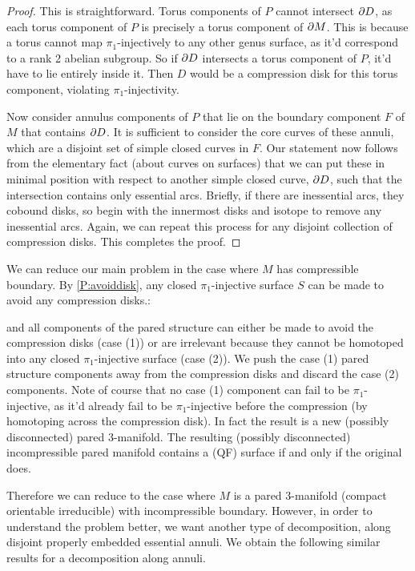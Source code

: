 \begin{proof}

This is straightforward. Torus components of $P$ cannot intersect $\partial D$, as
each torus component of $P$ is precisely a torus component of $\partial M$. This is
because a torus cannot map $\pi_1$-injectively to any other genus surface, as
it'd correspond to a rank 2 abelian subgroup. So if $\partial D$ intersects a torus
component of $P$, it'd have to lie entirely inside it. Then $D$ would be
a compression disk for this torus component, violating $\pi_1$-injectivity.

Now consider annulus components of $P$ that lie on the boundary component $F$
of $M$ that contains $\partial D$. It is sufficient to consider the core curves of
these annuli, which are a disjoint set of simple closed curves in $F$. Our
statement now follows from the elementary fact (about curves on surfaces) that
we can put these in minimal position with respect to another simple closed
curve, $\partial D$, such that the intersection contains only essential arcs.
Briefly, if there are inessential arcs, they cobound disks, so begin with the
innermost disks and isotope to remove any inessential arcs. Again, we can
repeat this process for any disjoint collection of compression disks. This
completes the proof.

\end{proof}

We can reduce our main problem in the case where $M$ has compressible boundary.
By \ref{P:avoiddisk}, any closed $\pi_1$-injective surface $S$ can be made to
avoid any compression disks.:

and all components of the pared structure can either be made to avoid the
compression disks (case (1)) or are irrelevant because they cannot be homotoped
into any closed $\pi_1$-injective surface (case (2)). We push the case (1)
pared structure components away from the compression disks and discard the case
(2) components. Note of course that no case (1) component can fail to be
$\pi_1$-injective, as it'd already fail to be $\pi_1$-injective before the
compression (by homotoping across the compression disk). In fact the result is
a new (possibly disconnected) pared $3$-manifold.  The resulting (possibly
disconnected) incompressible pared manifold contains a (QF) surface if and only
if the original does.

Therefore we can reduce to the case where $M$ is a pared $3$-manifold (compact
orientable irreducible) with incompressible boundary. However, in order to
understand the problem better, we want another type of decomposition, along
disjoint properly embedded essential annuli. We obtain the following similar
results for a decomposition along annuli.

